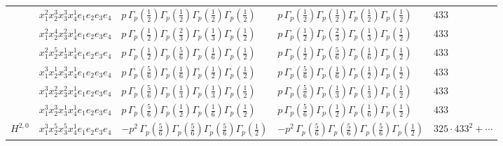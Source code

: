 \documentclass[11pt]{article}
\begin{document}
\begin{table}[ht]
{\begin{tabular}{@{}lllll@{}}
 & $x_{1}^{2} x_{2}^{3} x_{3}^{3} x_{4}^{1}  e_{1} e_{2} e_{3} e_{4}$ & $p \, \Gamma_p \left( \frac{1}{2} \right) \Gamma_p \left( \frac{1}{2} \right) \Gamma_p \left( \frac{1}{2} \right) \Gamma_p \left( \frac{1}{2} \right)$ & $p \, \Gamma_p \left( \frac{1}{2} \right) \Gamma_p \left( \frac{1}{2} \right) \Gamma_p \left( \frac{1}{2} \right) \Gamma_p \left( \frac{1}{2} \right)$ & $433$ \\
 & $x_{1}^{2} x_{2}^{4} x_{3}^{2} x_{4}^{1}  e_{1} e_{2} e_{3} e_{4}$ & $p \, \Gamma_p \left( \frac{1}{2} \right) \Gamma_p \left( \frac{2}{3} \right) \Gamma_p \left( \frac{1}{3} \right) \Gamma_p \left( \frac{1}{2} \right)$ & $p \, \Gamma_p \left( \frac{1}{2} \right) \Gamma_p \left( \frac{2}{3} \right) \Gamma_p \left( \frac{1}{3} \right) \Gamma_p \left( \frac{1}{2} \right)$ & $433$ \\
 & $x_{1}^{2} x_{2}^{5} x_{3}^{1} x_{4}^{1}  e_{1} e_{2} e_{3} e_{4}$ & $p \, \Gamma_p \left( \frac{1}{2} \right) \Gamma_p \left( \frac{5}{6} \right) \Gamma_p \left( \frac{1}{6} \right) \Gamma_p \left( \frac{1}{2} \right)$ & $p \, \Gamma_p \left( \frac{1}{2} \right) \Gamma_p \left( \frac{5}{6} \right) \Gamma_p \left( \frac{1}{6} \right) \Gamma_p \left( \frac{1}{2} \right)$ & $433$ \\
 & $x_{1}^{3} x_{2}^{1} x_{3}^{3} x_{4}^{1}  e_{1} e_{2} e_{3} e_{4}$ & $p \, \Gamma_p \left( \frac{5}{6} \right) \Gamma_p \left( \frac{1}{6} \right) \Gamma_p \left( \frac{1}{2} \right) \Gamma_p \left( \frac{1}{2} \right)$ & $p \, \Gamma_p \left( \frac{5}{6} \right) \Gamma_p \left( \frac{1}{6} \right) \Gamma_p \left( \frac{1}{2} \right) \Gamma_p \left( \frac{1}{2} \right)$ & $433$ \\
 & $x_{1}^{3} x_{2}^{2} x_{3}^{2} x_{4}^{1}  e_{1} e_{2} e_{3} e_{4}$ & $p \, \Gamma_p \left( \frac{5}{6} \right) \Gamma_p \left( \frac{1}{3} \right) \Gamma_p \left( \frac{1}{3} \right) \Gamma_p \left( \frac{1}{2} \right)$ & $p \, \Gamma_p \left( \frac{5}{6} \right) \Gamma_p \left( \frac{1}{3} \right) \Gamma_p \left( \frac{1}{3} \right) \Gamma_p \left( \frac{1}{2} \right)$ & $433$ \\
 & $x_{1}^{3} x_{2}^{3} x_{3}^{1} x_{4}^{1}  e_{1} e_{2} e_{3} e_{4}$ & $p \, \Gamma_p \left( \frac{5}{6} \right) \Gamma_p \left( \frac{1}{2} \right) \Gamma_p \left( \frac{1}{6} \right) \Gamma_p \left( \frac{1}{2} \right)$ & $p \, \Gamma_p \left( \frac{5}{6} \right) \Gamma_p \left( \frac{1}{2} \right) \Gamma_p \left( \frac{1}{6} \right) \Gamma_p \left( \frac{1}{2} \right)$ & $433$ \\
\midrule
$H^{2,0}$ & $x_{1}^{3} x_{2}^{5} x_{3}^{5} x_{4}^{1}  e_{1} e_{2} e_{3} e_{4}$ & $- p^{2} \, \Gamma_p \left( \frac{5}{6} \right) \Gamma_p \left( \frac{5}{6} \right) \Gamma_p \left( \frac{5}{6} \right) \Gamma_p \left( \frac{1}{2} \right)$ & $- p^{2} \, \Gamma_p \left( \frac{5}{6} \right) \Gamma_p \left( \frac{5}{6} \right) \Gamma_p \left( \frac{5}{6} \right) \Gamma_p \left( \frac{1}{2} \right)$ & $325{\cdot}433^{2}{+}\cdots$ \\

\end{tabular}}
\end{table}
\end{document}
